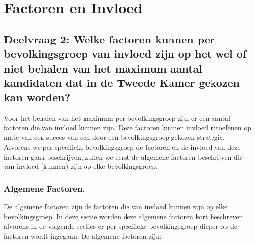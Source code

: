 \newpage
\section{Factoren en Invloed}
\label{h5}



\subsection*{Deelvraag 2: Welke factoren kunnen per bevolkingsgroep van invloed zijn op het wel of niet behalen van het maximum aantal kandidaten dat in de Tweede Kamer gekozen kan worden?}
Voor het behalen van het maximum per bevolkingsgroep zijn er een aantal factoren die van invloed kunnen zijn. Deze factoren kunnen invloed uitoefenen op mate van een succes van een door een bevolkingsgroep gekozen strategie. Alvorens we per specifieke bevolkingsgroep de factoren en de invloed van deze factoren gaan beschrijven, zullen we eerst de algemene factoren beschrijven die van invloed (kunnen) zijn op elke bevolkingsgroep.

\subsubsection*{Algemene Factoren.}
De algemene factoren zijn de factoren die van invloed kunnen zijn op elke bevolkingsgroep. In deze sectie worden deze algemene factoren kort beschreven alvorens in de volgende secties er per specifieke bevolkingsgroep dieper op de factoren wordt ingegaan. De algemene factoren zijn:\\

